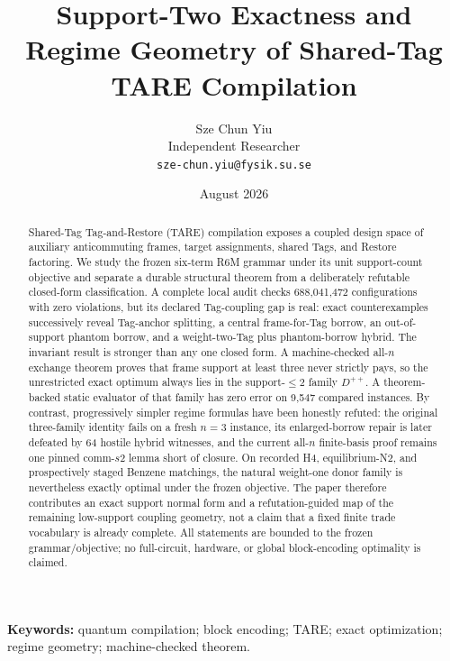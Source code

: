 \documentclass[11pt]{article}
\title{Support-Two Exactness and Regime Geometry of Shared-Tag TARE Compilation}
\author{Sze Chun Yiu\\Independent Researcher\\\texttt{sze-chun.yiu@fysik.su.se}}
\date{August 2026}
\begin{document}
\maketitle

\begin{abstract}
Shared-Tag Tag-and-Restore (TARE) compilation exposes a coupled design space of auxiliary anticommuting frames, target assignments, shared Tags, and Restore factoring. We study the frozen six-term R6M grammar under its unit support-count objective and separate a durable structural theorem from a deliberately refutable closed-form classification. A complete local audit checks 688,041,472 configurations with zero violations, but its declared Tag-coupling gap is real: exact counterexamples successively reveal Tag-anchor splitting, a central frame-for-Tag borrow, an out-of-support phantom borrow, and a weight-two-Tag plus phantom-borrow hybrid. The invariant result is stronger than any one closed form. A machine-checked all-$n$ exchange theorem proves that frame support at least three never strictly pays, so the unrestricted exact optimum always lies in the support-$\leq2$ family $D^{++}$. A theorem-backed static evaluator of that family has zero error on 9,547 compared instances. By contrast, progressively simpler regime formulas have been honestly refuted: the original three-family identity fails on a fresh $n=3$ instance, its enlarged-borrow repair is later defeated by 64 hostile hybrid witnesses, and the current all-$n$ finite-basis proof remains one pinned comm-$s2$ lemma short of closure. On recorded H4, equilibrium-N2, and prospectively staged Benzene matchings, the natural weight-one donor family is nevertheless exactly optimal under the frozen objective. The paper therefore contributes an exact support normal form and a refutation-guided map of the remaining low-support coupling geometry, not a claim that a fixed finite trade vocabulary is already complete. All statements are bounded to the frozen grammar/objective; no full-circuit, hardware, or global block-encoding optimality is claimed.
\end{abstract}

\noindent\textbf{Keywords:} quantum compilation; block encoding; TARE; exact optimization; regime geometry; machine-checked theorem.













\end{document}
